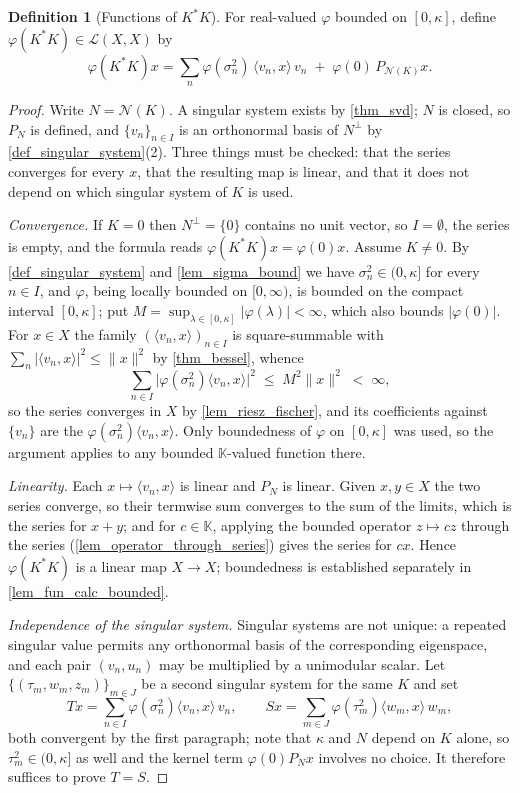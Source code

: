 \documentclass[a4paper]{report}
\theoremstyle{plain}
\theoremstyle{definition}
\newtheorem{definition}[theorem]{Definition}
\theoremstyle{remark}
\begin{document}
\begin{definition}[Functions of $K^*K$]
  \label{def_fun_calc}
  For real-valued $\varphi$ bounded on $[0,\kappa]$, define
  $\varphi(K^*K) \in \mathcal{L}(X,X)$ by
  \[
    \varphi(K^*K)x = \sum_n \varphi(\sigma_n^2)\,\langle v_n,x\rangle\,v_n
      \;+\; \varphi(0)\,P_{\mathcal{N}(K)}x .
  \]
\end{definition}
\begin{proof}
  Write $N = \mathcal{N}(K)$.  A singular system exists by \cref{thm_svd}; $N$ is closed,
  so $P_N$ is defined, and $\{v_n\}_{n \in I}$ is an orthonormal basis of $N^\perp$ by
  \cref{def_singular_system}(2).  Three things must be checked: that the series converges
  for every $x$, that the resulting map is linear, and that it does not depend on which
  singular system of $K$ is used.

  \emph{Convergence.}  If $K = 0$ then $N^\perp = \{0\}$ contains no unit vector, so
  $I = \emptyset$, the series is empty, and the formula reads
  $\varphi(K^*K)x = \varphi(0)x$.  Assume $K \ne 0$.  By \cref{def_singular_system} and
  \cref{lem_sigma_bound} we have $\sigma_n^2 \in (0,\kappa]$ for every $n \in I$, and $\varphi$, being locally bounded on
  $[0,\infty)$, is bounded on the compact interval $[0,\kappa]$; put
  $M = \sup_{\lambda \in [0,\kappa]}|\varphi(\lambda)| < \infty$, which also bounds
  $|\varphi(0)|$.  For $x \in X$ the family $(\langle v_n,x\rangle)_{n \in I}$ is
  square-summable with $\sum_n |\langle v_n,x\rangle|^2 \le \|x\|^2$ by \cref{thm_bessel},
  whence
  \[
    \sum_{n \in I} \bigl|\varphi(\sigma_n^2)\langle v_n,x\rangle\bigr|^2
      \;\le\; M^2\|x\|^2 \;<\; \infty ,
  \]
  so the series converges in $X$ by \cref{lem_riesz_fischer}, and its coefficients against
  $\{v_n\}$ are the $\varphi(\sigma_n^2)\langle v_n,x\rangle$.  Only boundedness of
  $\varphi$ on $[0,\kappa]$ was used, so the argument applies to any bounded
  $\mathbb{K}$-valued function there.

  \emph{Linearity.}  Each $x \mapsto \langle v_n,x\rangle$ is linear and $P_N$ is linear.
  Given $x,y \in X$ the two series converge, so their termwise sum converges to the sum of
  the limits, which is the series for $x+y$; and for
  $c \in \mathbb{K}$, applying the bounded operator $z \mapsto cz$ through the series
  (\cref{lem_operator_through_series}) gives the series for $cx$.  Hence
  $\varphi(K^*K)$ is a linear map $X \to X$; boundedness is established separately in
  \cref{lem_fun_calc_bounded}.

  \emph{Independence of the singular system.}  Singular systems are not unique: a repeated
  singular value permits any orthonormal basis of the corresponding eigenspace, and each
  pair $(v_n,u_n)$ may be multiplied by a unimodular scalar.  Let
  $\{(\tau_m,w_m,z_m)\}_{m \in J}$ be a second singular system for the same $K$ and set
  \[
    Tx = \sum_{n \in I}\varphi(\sigma_n^2)\langle v_n,x\rangle\,v_n , \qquad
    Sx = \sum_{m \in J}\varphi(\tau_m^2)\langle w_m,x\rangle\,w_m ,
  \]
  both convergent by the first paragraph; note that $\kappa$ and $N$ depend on $K$ alone,
  so $\tau_m^2 \in (0,\kappa]$ as well and the kernel term $\varphi(0)P_Nx$ involves no
  choice.  It therefore suffices to prove $T = S$.


\end{proof}
\end{document}
